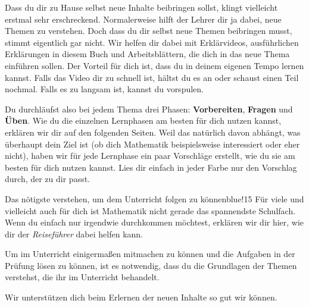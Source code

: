 \documentclass[../main.tex]{subfiles}
\begin{document}
\begin{multicols}{3}
\end{multicols}

Dass du dir zu Hause selbst neue Inhalte beibringen sollst, klingt vielleicht erstmal sehr erschreckend. Normalerweise hilft der Lehrer dir ja dabei, neue Themen zu verstehen. Doch dass du dir selbst neue Themen beibringen musst, stimmt eigentlich gar nicht. Wir helfen dir dabei mit Erklärvideos, ausführlichen Erklärungen in diesem Buch und Arbeitsblättern, die dich in das neue Thema einführen sollen. Der Vorteil für dich ist, dass du in deinem eigenen Tempo lernen kannst. Falls das Video dir zu schnell ist, hältst du es an oder schaust einen Teil nochmal. Falls es zu langsam ist, kannst du vorspulen.

Du durchläufst also bei jedem Thema drei Phasen: \textbf{Vorbereiten}, \textbf{Fragen} und \textbf{Üben}. Wie du die einzelnen Lernphasen am besten für dich nutzen kannst, erklären wir dir auf den folgenden Seiten. Weil das natürlich davon abhängt, was überhaupt dein Ziel ist (ob dich Mathematik beispielsweise interessiert oder eher nicht), haben wir für jede Lernphase ein paar Vorschläge erstellt, wie du sie am besten für dich nutzen kannst. Lies dir einfach in jeder Farbe nur den Vorschlag durch, der zu dir passt.

\begin{goal}{Das nötigste verstehen, um dem Unterricht folgen zu können}{blue!15}
    Für viele und vielleicht auch für dich ist Mathematik nicht gerade das spannendste Schulfach. Wenn du einfach nur irgendwie durchkommen möchtest, erklären wir dir hier, wie dir der \emph{Reiseführer} dabei helfen kann.

    Um im Unterricht einigermaßen mitmachen zu können und die Aufgaben in der Prüfung lösen zu können, ist es notwendig, dass du die Grundlagen der Themen verstehst, die ihr im Unterricht behandelt.

    Wir unterstützen dich beim Erlernen der neuen Inhalte so gut wir können. 
\end{goal}
\end{document}
